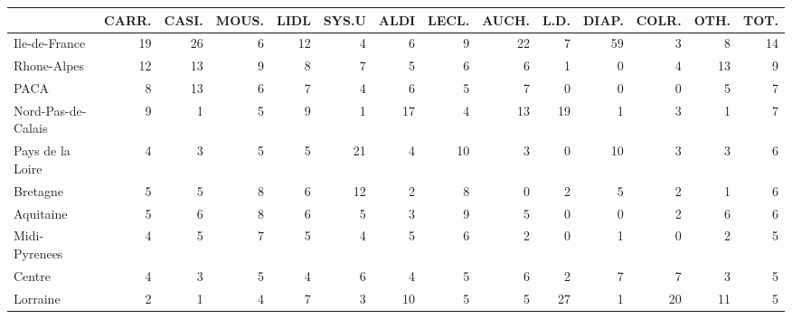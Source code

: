 \documentclass[11pt]{article}
\begin{document}
\begin{table}[H]
\begin{tabular}{lrrrrrrrrrrrrr}
\toprule
{} &      CARR. &      CASI. &      MOUS. &       LIDL &      SYS.U &       ALDI &      LECL. &      AUCH. &       L.D. &      DIAP. &      COLR. &       OTH. &       TOT. \\
\midrule
Ile-de-France        &         19 &         26 &          6 &         12 &          4 &          6 &          9 &         22 &          7 &         59 &          3 &          8 &         14 \\
Rhone-Alpes          &         12 &         13 &          9 &          8 &          7 &          5 &          6 &          6 &          1 &          0 &          4 &         13 &          9 \\
PACA                 &          8 &         13 &          6 &          7 &          4 &          6 &          5 &          7 &          0 &          0 &          0 &          5 &          7 \\
Nord-Pas-de-Calais   &          9 &          1 &          5 &          9 &          1 &         17 &          4 &         13 &         19 &          1 &          3 &          1 &          7 \\
Pays de la Loire     &          4 &          3 &          5 &          5 &         21 &          4 &         10 &          3 &          0 &         10 &          3 &          3 &          6 \\
Bretagne             &          5 &          5 &          8 &          6 &         12 &          2 &          8 &          0 &          2 &          5 &          2 &          1 &          6 \\
Aquitaine            &          5 &          6 &          8 &          6 &          5 &          3 &          9 &          5 &          0 &          0 &          2 &          6 &          6 \\
Midi-Pyrenees        &          4 &          5 &          7 &          5 &          4 &          5 &          6 &          2 &          0 &          1 &          0 &          2 &          5 \\
Centre               &          4 &          3 &          5 &          4 &          6 &          4 &          5 &          6 &          2 &          7 &          7 &          3 &          5 \\
Lorraine             &          2 &          1 &          4 &          7 &          3 &         10 &          5 &          5 &         27 &          1 &         20 &         11 &          5 \\

\end{tabular}
\end{table}
\end{document}
